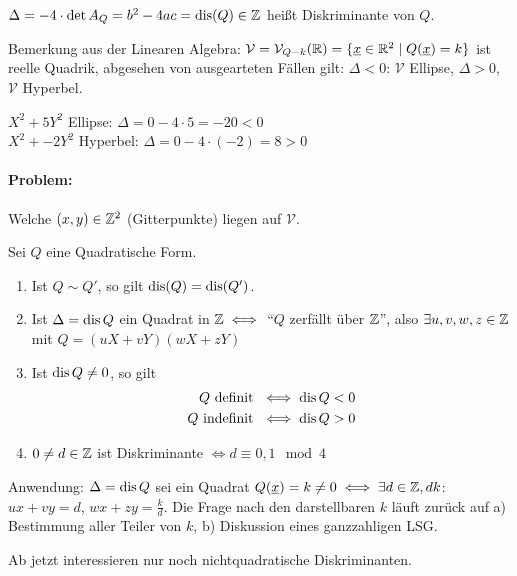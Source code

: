 \documentclass[a4paper,twoside,DIV15,BCOR12mm]{scrbook}
\begin{document}
\begin{definition}
$\Delta =-4 \cdot \det A_Q = b^2 - 4ac = \mathop{\rm dis}\nolimits(Q) \in \mathbb{Z}$ heißt Diskriminante von $Q$.
\end{definition}

Bemerkung aus der Linearen Algebra: $\mathcal{V} = \mathcal{V}_{Q-k}(\mathbb{R}) = \{\underline x \in \mathbb{R}^2 \mid Q(\underline x) = k\}$ ist reelle Quadrik, abgesehen von ausgearteten Fällen gilt: $\Delta <0$: $\mathcal{V}$ Ellipse, $\Delta >0$, $\mathcal{V}$ Hyperbel.

\begin{beispiel}
$X^2 + 5Y^2$ Ellipse: $\Delta = 0-4\cdot 5 = -20 < 0$\\
$X^2 + -2Y^2$ Hyperbel: $\Delta = 0-4\cdot (-2) = 8 > 0$
\end{beispiel}

\paragraph{Problem:} Welche $(x,y)\in\mathbb{Z}^2$ (Gitterpunkte) liegen auf $\mathcal{V}$.

\begin{satz}[Diskriminantensatz]
Sei $Q$ eine Quadratische Form.
\begin{enumerate}
\item Ist $Q\sim Q'$, so gilt $\mathop{\rm dis}\nolimits(Q) = \mathop{\rm dis}\nolimits(Q')$.
\item Ist $\Delta = \mathop{\rm dis}\nolimits Q$ ein Quadrat in $\mathbb{Z} \iff$ "`$Q$ zerfällt über $\mathbb{Z}$"', also $\exists u,v,w,z\in\mathbb{Z}$ mit $Q=(uX+vY)(wX+zY)$
\item Ist $\mathop{\rm dis}\nolimits Q \ne 0$, so gilt 
\begin{align*}
 Q \text{ definit } &\iff \mathop{\rm dis}\nolimits Q <0 \\
 Q \text{ indefinit } &\iff \mathop{\rm dis}\nolimits Q > 0
 \end{align*}
\item $0\ne d\in \mathbb{Z}$ ist Diskriminante $\iff d\equiv 0,1 \mod 4$
\end{enumerate}
\end{satz}

Anwendung: $\Delta = \mathop{\rm dis}\nolimits Q$ sei ein Quadrat
$Q(\underline x) = k \ne 0 \iff \exists d\in\mathbb{Z}, d\mit k$: $ux+vy=d$, $wx+zy=\frac kd$. Die Frage nach den darstellbaren $k$ läuft zurück auf a) Bestimmung aller Teiler von $k$, b) Diskussion eines ganzzahligen LSG.

Ab jetzt interessieren nur noch nichtquadratische Diskriminanten.
\end{document}
